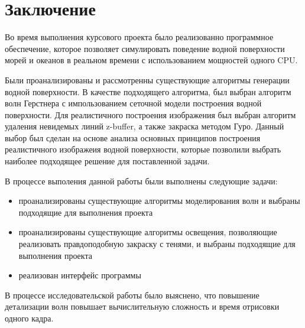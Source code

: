 \chapter*{Заключение}

Во время выполнения курсового проекта было реализованно программное обеспечение, которое позволяет симулировать поведение водной поверхности морей и океанов в реальном времени с использованием мощностей одного CPU.

Были проанализированы и рассмотренны существующие алгоритмы генерации водной поверхности. В качестве подходящего алгоритма, был выбран алгоритм волн Герстнера с импользованием сеточной модели построения водной поверхности. Для реалистичного построения изображения был выбран алгоритм удаления невидемых линий z-buffer, а также закраска методом Гуро. Данный выбор был сделан на основе анализа основных принципов построения реалистичного изображеия водной поверхности, которые позволили выбрать наиболее подходящее решение для поставленной задачи.

В процессе выполения данной работы были выполнены следующие задачи:

\begin{itemize}
	\item проанализированы существующие алгоритмы моделирования волн и выбраны подходящие для выполнения проекта
	\item проанализированы существующие алгоритмы освещения, позволяющие реализовать правдоподобную закраску с тенями, и выбраны подходящие для выполнения проекта
	\item реализован интерфейс программы
\end{itemize}

В процессе исследовательской работы было выяснено, что повышение детализации волн повышает вычислительную сложность и время отрисовки одного кадра.

